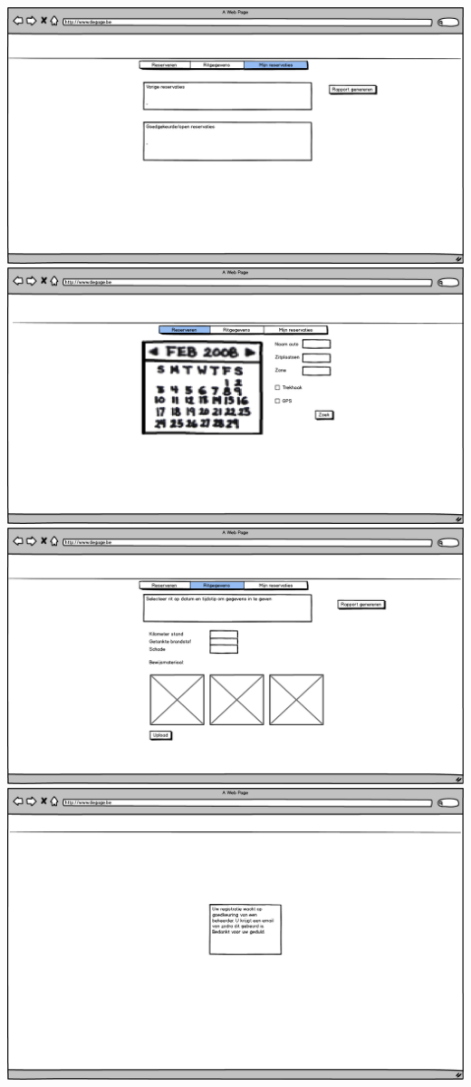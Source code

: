 \documentclass[]{article}
\begin{document}
\includegraphics[scale=0.4]{mockups/delen_mijnreservaties.png}
\includegraphics[scale=0.4]{mockups/delen_reserveren.png}
\includegraphics[scale=0.4]{mockups/delen_ritgegevens.png}
\includegraphics[scale=0.4]{mockups/goedkeuringpending.png}
\end{document}
